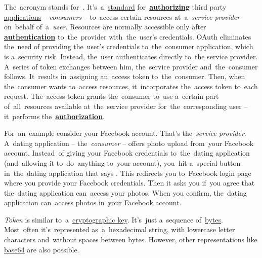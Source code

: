 The~acronym stands for~.
It's~a~\hyperref[protocolstandard]{standard} for~\hyperref[authenticationauthorization]{\textbf{authorizing}} third party \hyperref[applicationprocessprogramservicethread]{applications} -- \textit{consumers} -- to~access certain resources at~a~\textit{service provider} on~behalf of~a~\textit{user}.
Resources are normally accessible only after \hyperref[authenticationauthorization]{\textbf{authentication}} to~the~provider with~the~user's credentials.
OAuth eliminates the~need of providing the~user's credentials to~the~consumer application, which is a~security risk.
Instead, the~user authenticates directly to~the service provider.
A~series of token exchanges between him, the~service provider and~the~consumer follows.
It~results in~assigning an~access token to~the~consumer.
Then, when the~consumer wants to~access resources, it~incorporates the~access token to~each request.
The~access token grants the~consumer to~use a~certain part of~all~resources available at~the~service provider for~the~corresponding user -- it~performs the~\hyperref[authenticationauthorization]{\textbf{authorization}}.

For~an~example consider your Facebook account.
That's the~\textit{service provider}.
A~dating application -- the~\textit{consumer} -- offers photo upload from~your Facebook account.
Instead~of giving your Facebook credentials to~the~dating application (and~allowing it to~do~anything to~your account), you~hit a~special button in~the~dating application that says .
This redirects you to~Facebook login page where you provide your Facebook credentials.
Then it asks you if~you agree that the~dating application can~access your photos.
When you confirm, the~dating application can~access photos in~your Facebook account.

\textit{Token} is similar to~a~\hyperref[key]{cryptographic key}.
It's~just a~sequence of~\hyperref[bitsbytes]{bytes}.
Most~often it's~represented as~a~hexadecimal string, with lowercase letter characters and~without spaces between bytes.
However, other representations like \hyperref[base64]{base64} are also possible.

